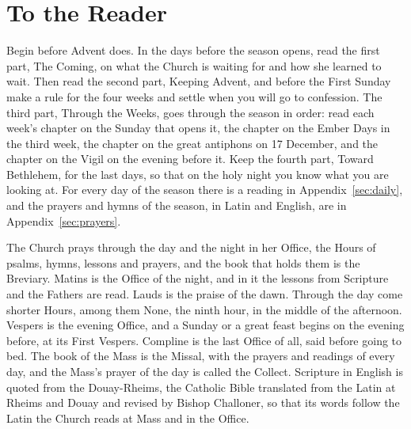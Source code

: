 \section*{To the Reader}

Begin before Advent does. In the days before the season opens, read the first
part, The Coming, on what the Church is waiting for and how she learned to
wait. Then read the second part, Keeping Advent, and before the First Sunday
make a rule for the four weeks and settle when you will go to confession. The
third part, Through the Weeks, goes through the season in order: read each
week's chapter on the Sunday that opens it, the chapter on the Ember Days in
the third week, the chapter on the great antiphons on 17 December, and the
chapter on the Vigil on the evening before it. Keep the fourth part, Toward
Bethlehem, for the last days, so that on the holy night you know what you are
looking at. For every day of the season there is a reading in
Appendix~\ref{sec:daily}, and the prayers and hymns of the season, in Latin and
English, are in Appendix~\ref{sec:prayers}.

The Church prays through the day and the night in her Office, the Hours of
psalms, hymns, lessons and prayers, and the book that holds them is the
Breviary. Matins is the Office of the night, and in it the lessons from
Scripture and the Fathers are read. Lauds is the
praise of the dawn. Through the day come shorter Hours, among them None, the
ninth hour, in the middle of the afternoon. Vespers is the evening Office, and a Sunday or a great feast begins on the evening before, at its
First Vespers. Compline is the last Office of all, said before going to bed.
The book of the Mass is the Missal, with the prayers and readings of every day,
and the Mass's prayer of the day is called the Collect. Scripture in English is
quoted from the Douay-Rheims, the Catholic Bible translated from the Latin at
Rheims and Douay and revised by Bishop Challoner, so that its words follow the
Latin the Church reads at Mass and in the Office.
